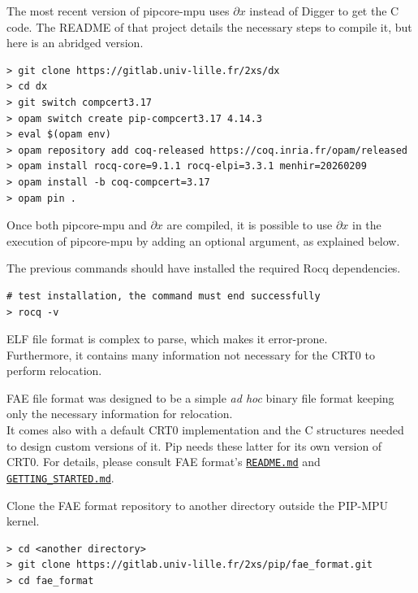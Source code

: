 \documentclass[10pt,a4paper,titlepage]{refart}
\begin{document}
The most recent version of pipcore-mpu uses $\partial x$ instead of Digger to get the C code. The README 
of that project details the necessary steps to compile it, but here is an abridged version.

\begin{lstlisting}[style=BashStyle]
> git clone https://gitlab.univ-lille.fr/2xs/dx
> cd dx
> git switch compcert3.17
> opam switch create pip-compcert3.17 4.14.3
> eval $(opam env)
> opam repository add coq-released https://coq.inria.fr/opam/released
> opam install rocq-core=9.1.1 rocq-elpi=3.3.1 menhir=20260209
> opam install -b coq-compcert=3.17
> opam pin .
\end{lstlisting}

Once both pipcore-mpu and $\partial x$ are compiled, it is possible to use $\partial x$ in the execution of pipcore-mpu by adding an optional argument, as explained below.

The previous commands should have installed the required Rocq dependencies.

\begin{lstlisting}[style=BashStyle]
# test installation, the command must end successfully
> rocq -v
\end{lstlisting}

ELF file format is complex to parse, which makes it error-prone.\\
Furthermore, it contains many information not necessary for the CRT0 to perform relocation.

FAE file format was designed to be a simple \textit{ad hoc} binary file format keeping only the necessary information for relocation.\\
It comes also with a default CRT0 implementation and the C structures needed to design custom versions of it.
Pip needs these latter for its own version of CRT0.
For details, please consult FAE format's \href{https://gitlab.univ-lille.fr/2xs/pip/fae_format/-/blob/master/README.md?ref_type=heads}{\texttt{README.md}}
and \href{https://gitlab.univ-lille.fr/2xs/pip/fae_format/-/blob/master/GETTING_STARTED.md?ref_type=heads}{\texttt{GETTING\_STARTED.md}}.

Clone the FAE format repository to another directory outside the PIP-MPU kernel.
\begin{lstlisting}[style=BashStyle]
> cd <another directory>
> git clone https://gitlab.univ-lille.fr/2xs/pip/fae_format.git
> cd fae_format
\end{lstlisting}
\end{document}
